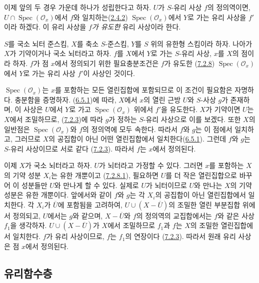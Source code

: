 이제 앞의 두 경우 가운데 하나가 성립한다고 하자. $U$가 $S$-유리
사상 $f$의 정의역이면, $U\cap\operatorname{Spec}(\mathscr{O}_x)$에서
$f$와 일치하는(\hyperref[I.2.4.2-ko]{2.4.2})
$\operatorname{Spec}(\mathscr{O}_x)$에서 $Y$로 가는 유리 사상을
$f'$이라 하겠다. 이 유리 사상을 \emph{$f$가 유도한} 유리 사상이라
한다.

\begin{proposition}[7.2.9]
\label{I.7.2.9-ko}
$S$를 국소 뇌터 준스킴, $X$를 축소 $S$-준스킴, $Y$를 $S$ 위의
유한형 스킴이라 하자. 나아가 $X$가 기약이거나 국소 뇌터라고 하자.
$f$를 $X$에서 $Y$로 가는 $S$-유리 사상, $x$를 $X$의 점이라 하자.
$f$가 점 $x$에서 정의되기 위한 필요충분조건은 $f$가 유도한
(\hyperref[I.7.2.8-ko]{7.2.8})
$\operatorname{Spec}(\mathscr{O}_x)$에서 $Y$로 가는 유리 사상 $f'$이
사상인 것이다.
\end{proposition}

$\operatorname{Spec}(\mathscr{O}_x)$는 $x$를 포함하는 모든
열린집합에 포함되므로 이 조건이 필요함은 자명하다. 충분함을 증명하자.
(\hyperref[I.6.5.1-ko]{6.5.1})에 따라, $X$에서 $x$의 열린 근방 $U$와
$S$-사상 $g$가 존재하며, 이 사상은 $U$에서 $Y$로 가고
$\operatorname{Spec}(\mathscr{O}_x)$ 위에서 $f'$을 유도한다. $X$가 기약이면 $U$는 $X$에서
조밀하므로, (\hyperref[I.7.2.3-ko]{7.2.3})에 따라 $g$가 정하는
$S$-유리 사상으로 이를 보겠다. 또한 $X$의 일반점은
$\operatorname{Spec}(\mathscr{O}_x)$와 $f$의 정의역에 모두 속한다.
따라서 $f$와 $g$는 이 점에서 일치하고, 그러므로 $X$의 공집합이 아닌
어떤 열린집합에서 일치한다(\hyperref[I.6.5.1-ko]{6.5.1}). 그런데
$f$와 $g$는 $S$-유리 사상이므로 서로 같다
(\hyperref[I.7.2.3-ko]{7.2.3}). 따라서 $f$는 $x$에서 정의된다.

이제 $X$가 국소 뇌터라고 하자. $U$가 뇌터라고 가정할 수 있다.
그러면 $x$를 포함하는 $X$의 기약 성분 $X_i$는 유한 개뿐이고
(\hyperref[I.7.2.8.1-ko]{7.2.8.1}), 필요하면 $U$를 더 작은
열린집합으로 바꾸어 이 성분들만 $U$와 만나게 할 수 있다. 실제로
$U$가 뇌터이므로 $U$와 만나는 $X$의 기약 성분은 유한 개뿐이다.
앞에서와 같이 $f$와 $g$는 각 $X_i$의 공집합이 아닌 열린집합에서
일치한다. 각 $X_i$가 $\overline U$에 포함됨을 고려하여,
$U\cup(X-\overline U)$의 조밀한 열린 부분집합 위에서 정의되고,
$U$에서는 $g$와 같으며, $X-\overline U$와 $f$의 정의역의 교집합에서는
$f$와 같은 사상 $f_1$을 생각하자. $U\cup(X-\overline U)$가 $X$에서
조밀하므로 $f_1$과 $f$는 $X$의 조밀한 열린집합에서 일치한다.
$f$가 유리 사상이므로, $f$는 $f_1$의 연장이다
(\hyperref[I.7.2.3-ko]{7.2.3}). 따라서 원래 유리 사상은 점 $x$에서 정의된다.

\subsection{유리함수층}
\label{subsection:I.7.3-ko}

